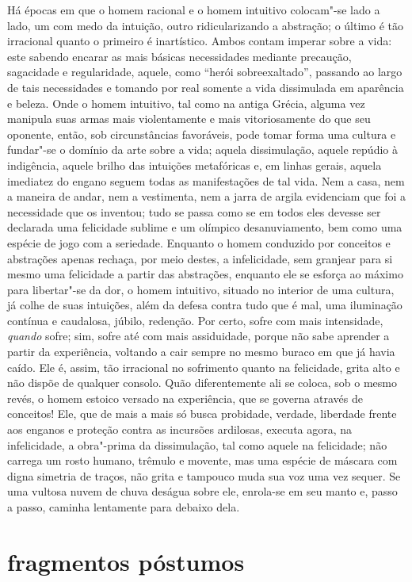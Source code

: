 Há épocas em que o homem racional e o homem intuitivo colocam"-se lado
a lado, um com medo da intuição, outro ridicularizando a abstração; o
último é tão irracional quanto o primeiro é inartístico. Ambos contam
imperar sobre a vida: este sabendo encarar as mais básicas necessidades
mediante precaução, sagacidade e regularidade, aquele, como “herói
sobreexaltado”, passando ao largo de tais necessidades e tomando por
real somente a vida dissimulada em aparência e beleza. Onde o homem
intuitivo, tal como na antiga Grécia, alguma vez manipula suas armas
mais violentamente e mais vitoriosamente do que seu oponente, então,
sob circunstâncias favoráveis, pode tomar forma uma cultura e
fundar"-se o domínio da arte sobre a vida; aquela dissimulação, aquele
repúdio à indigência, aquele brilho das intuições metafóricas e, em
linhas gerais, aquela imediatez do engano seguem todas as
manifestações de tal vida. Nem a casa, nem a maneira de andar, nem a
vestimenta, nem a jarra de argila evidenciam que foi a necessidade que
os inventou; tudo se passa como se em todos eles devesse ser declarada
uma felicidade sublime e um olímpico desanuviamento, bem como uma
espécie de jogo com a seriedade. Enquanto o homem conduzido por
conceitos e abstrações apenas rechaça, por meio destes, a infelicidade,
sem granjear para si mesmo uma felicidade a partir das abstrações,
enquanto ele se esforça ao máximo para libertar"-se da dor, o homem
intuitivo, situado no interior de uma cultura, já colhe de suas
intuições, além da defesa contra tudo que é mal, uma iluminação contínua e
caudalosa, júbilo, redenção. Por certo, sofre com mais
intensidade, \textit{quando} sofre; sim, sofre até com mais assiduidade,
porque não sabe aprender a partir da experiência, voltando a cair
sempre no mesmo buraco em que já havia caído. Ele é, assim, tão
irracional no sofrimento quanto na felicidade, grita alto e não dispõe
de qualquer consolo. Quão diferentemente ali se coloca, sob o mesmo
revés, o homem estoico versado na experiência, que se governa através
de conceitos! Ele, que de mais a mais só busca probidade, verdade,
liberdade frente aos enganos e proteção contra as incursões ardilosas,
executa agora, na infelicidade, a obra"-prima da dissimulação, tal
como aquele na felicidade; não carrega um rosto humano, trêmulo e
movente, mas uma espécie de máscara com digna simetria de traços, não
grita e tampouco muda sua voz uma vez sequer. Se uma vultosa nuvem de
chuva deságua sobre ele, enrola-se em seu manto e, passo a
passo, caminha lentamente para debaixo dela.

\part{fragmentos póstumos}

